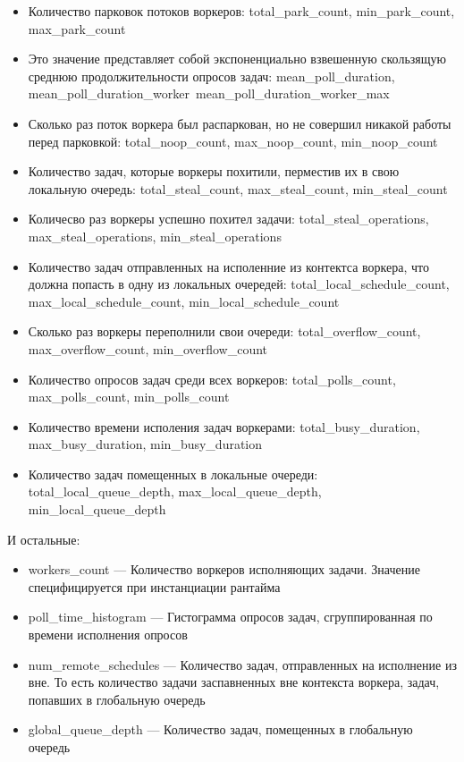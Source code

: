 \begin{itemize}
    \item Количество парковок потоков воркеров: total\_park\_count, min\_park\_count, max\_park\_count
    \item Это значение представляет собой экспоненциально взвешенную скользящую среднюю продолжительности опросов задач: mean\_poll\_duration, mean\_poll\_duration\_worker\, mean\_poll\_duration\_worker\_max
    \item Сколько раз поток воркера был распаркован, но не совершил никакой работы перед парковкой: total\_noop\_count, max\_noop\_count, min\_noop\_count
    \item Количество задач, которые воркеры похитили, перместив их в свою локальную очередь: total\_steal\_count, max\_steal\_count, min\_steal\_count
    \item Количесво раз воркеры успешно похител задачи: total\_steal\_operations, max\_steal\_operations, min\_steal\_operations
    \item Количество задач отправленных на исполенние из контектса воркера, что должна попасть в одну из локальных очередей: total\_local\_schedule\_count, max\_local\_schedule\_count, min\_local\_schedule\_count
    \item  Сколько раз воркеры переполнили свои очереди: total\_overflow\_count, max\_overflow\_count, min\_overflow\_count
    \item Количество опросов задач среди всех воркеров: total\_polls\_count, max\_polls\_count, min\_polls\_count
    \item Количество времени исполения задач воркерами: total\_busy\_duration, max\_busy\_duration, min\_busy\_duration
    \item Количество задач помещенных в локальные очереди: total\_local\_queue\_depth, max\_local\_queue\_depth, min\_local\_queue\_depth
\end{itemize}

И остальные:

\begin{itemize}
    \item workers\_count --- Количество воркеров исполняющих задачи. Значение специфицируется при инстанциации рантайма

    \item poll\_time\_histogram --- Гистограмма опросов задач, сгруппированная по времени исполнения опросов

    \item num\_remote\_schedules --- Количество задач, отправленных на исполнение из вне. То есть количество задачи заспавненных вне контекста воркера, задач, попавших в глобальную очередь

    \item global\_queue\_depth --- Количество задач, помещенных в глобальную очередь
\end{itemize}


